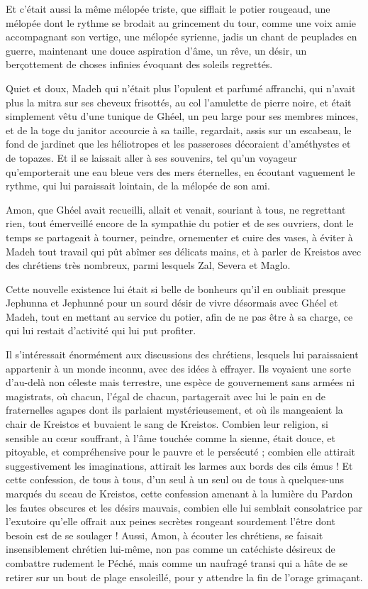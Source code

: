 \documentclass[a4paper, 11pt, oneside, polutonikogreek, french]{article}
\begin{document}
Et c'était aussi la même mélopée triste, que sifflait le potier rougeaud, une mélopée dont le rythme se brodait au grincement du tour, comme une voix amie accompagnant son vertige, une mélopée syrienne, jadis un chant de peuplades en guerre, maintenant une douce aspiration d'âme, un rêve, un désir, un berçottement de choses infinies évoquant des soleils regrettés.

Quiet et doux, Madeh qui n'était plus l'opulent et parfumé affranchi, qui n'avait plus la mitra sur ses cheveux frisottés, au col l'amulette de pierre noire, et était simplement vêtu d'une tunique de Ghéel, un peu large pour ses membres minces, et de la toge du janitor accourcie à sa taille, regardait, assis sur un escabeau, le fond de jardinet que les héliotropes et les passeroses décoraient d'améthystes et de topazes. Et il se laissait aller à ses souvenirs, tel qu'un voyageur qu'emporterait une eau bleue vers des mers éternelles, en écoutant vaguement le rythme, qui lui paraissait lointain, de la mélopée de son ami.

Amon, que Ghéel avait recueilli, allait et venait, souriant à tous, ne regrettant rien, tout émerveillé encore de la sympathie du potier et de ses ouvriers, dont le temps se partageait à tourner, peindre, ornementer et cuire des vases, à éviter à Madeh tout travail qui pût abîmer ses délicats mains, et à parler de Kreistos avec des chrétiens très nombreux, parmi lesquels Zal, Severa et Maglo.

Cette nouvelle existence lui était si belle de bonheurs qu'il en oubliait presque Jephunna et Jephunné pour un sourd désir de vivre désormais avec Ghéel et Madeh, tout en mettant au service du potier, afin de ne pas être à sa charge, ce qui lui restait d'activité qui lui put profiter.

Il s'intéressait énormément aux discussions des chrétiens, lesquels lui paraissaient appartenir à un monde inconnu, avec des idées à effrayer. Ils voyaient une sorte d'au-delà non céleste mais terrestre, une espèce de gouvernement sans armées ni magistrats, où chacun, l'égal de chacun, partagerait avec lui le pain en de fraternelles agapes dont ils parlaient mystérieusement, et où ils mangeaient la chair de Kreistos et buvaient le sang de Kreistos. Combien leur religion, si sensible au cœur souffrant, à l'âme touchée comme la sienne, était douce, et pitoyable, et compréhensive pour le pauvre et le persécuté ; combien elle attirait suggestivement les imaginations, attirait les larmes aux bords des cils émus ! Et cette confession, de tous à tous, d'un seul à un seul ou de tous à quelques-uns marqués du sceau de Kreistos, cette confession amenant à la lumière du Pardon les fautes obscures et les désirs mauvais, combien elle lui semblait consolatrice par l'exutoire qu'elle offrait aux peines secrètes rongeant sourdement l'être dont besoin est de se soulager ! Aussi, Amon, à écouter les chrétiens, se faisait insensiblement chrétien lui-même, non pas comme un catéchiste désireux de combattre rudement le Péché, mais comme un naufragé transi qui a hâte de se retirer sur un bout de plage ensoleillé, pour y attendre la fin de l'orage grimaçant.
\end{document}
